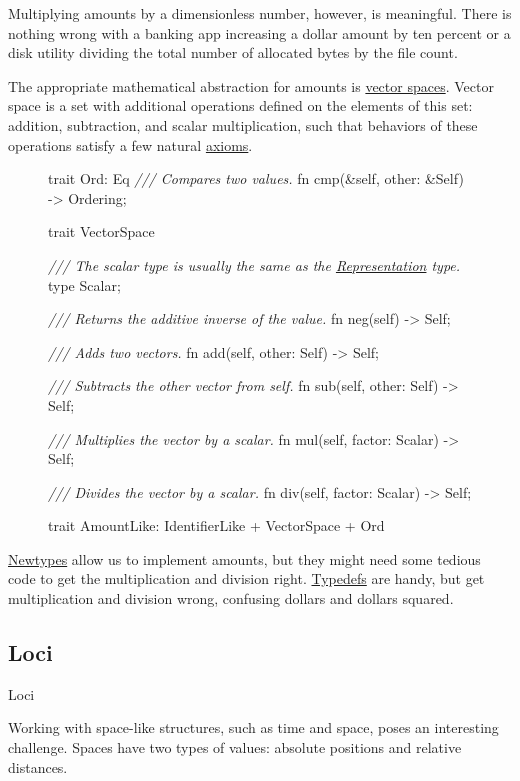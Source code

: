 \documentclass{article}
\begin{document}
Multiplying amounts by a dimensionless number, however, is meaningful.
There is nothing wrong with a banking app increasing a dollar amount by ten percent or a disk utility dividing the total number of allocated bytes by the file count.

The appropriate mathematical abstraction for amounts is \href{https://en.wikipedia.org/wiki/Vector_space}{vector spaces}.
Vector space is a set with additional operations defined on the elements of this set: addition, subtraction, and scalar multiplication, such that behaviors of these operations satisfy a few natural \href{https://en.wikipedia.org/wiki/Vector_space#Definition_and_basic_properties}{axioms}.

\begin{figure}
\begin{code}
trait Ord: Eq {
  \emph{/// Compares two values.}
  fn cmp(&self, other: &Self) -> Ordering;
}

trait VectorSpace {
  \emph{/// The scalar type is usually the same as the \href{#representation-type}{Representation} type.}
  type Scalar;

  \emph{/// Returns the additive inverse of the value.}
  fn neg(self) -> Self;
  
  \emph{/// Adds two vectors.}
  fn add(self, other: Self) -> Self;

  \emph{/// Subtracts the other vector from self.}
  fn sub(self, other: Self) -> Self;

  \emph{/// Multiplies the vector by a scalar.}
  fn mul(self, factor: Scalar) -> Self;

  \emph{/// Divides the vector by a scalar.}
  fn div(self, factor: Scalar) -> Self;
}

trait AmountLike: IdentifierLike + VectorSpace + Ord {}
\end{code}
\end{figure}

\href{#newtypes}{Newtypes} allow us to implement amounts, but they might need some tedious code to get the multiplication and division right.
\href{#typdefs}{Typedefs} are handy, but get multiplication and division wrong, confusing dollars and dollars squared.

\subsection{Loci}{Loci}

Working with space-like structures, such as time and space, poses an interesting challenge.
Spaces have two types of values: absolute positions and relative distances.
\end{document}
